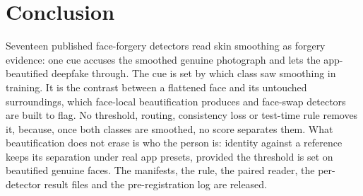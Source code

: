 \documentclass[journal]{IEEEtran}  %
\begin{document}
\section{Conclusion}
Seventeen published face-forgery detectors read skin smoothing as forgery evidence: one cue accuses the smoothed genuine
photograph and lets the app-beautified deepfake through. The cue is set by which class saw smoothing in training. It is the
contrast between a flattened face and its untouched surroundings, which face-local beautification produces and face-swap
detectors are built to flag. No threshold, routing, consistency loss or test-time rule removes it, because, once both
classes are smoothed, no score separates them.
What beautification does not erase is who the person is: identity against a reference keeps its separation under real app
presets, provided the threshold is set on beautified genuine faces. The manifests, the rule, the paired reader, the per-detector result files and the pre-registration log are released.



\end{document}

